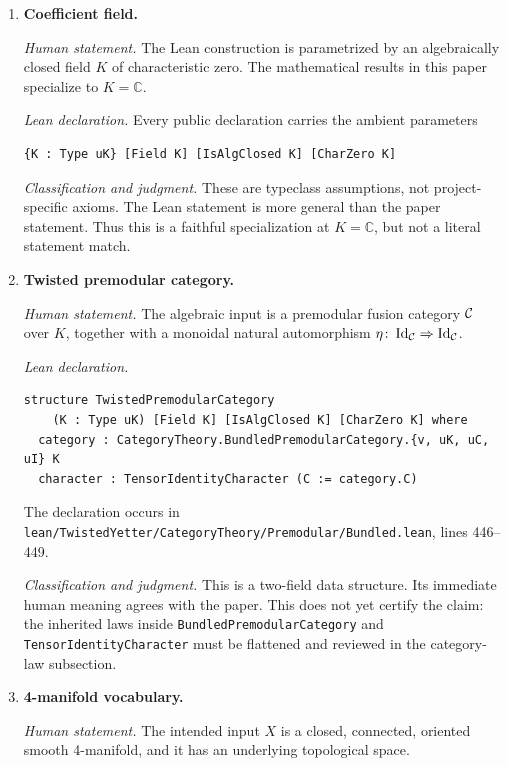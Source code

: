 \begin{enumerate}[label=\textbf{I\arabic*.},leftmargin=*]

\item \textbf{Coefficient field.}

\emph{Human statement.}
The Lean construction is parametrized by an algebraically closed field $K$ of
characteristic zero.  The mathematical results in this paper specialize to
$K=\mathbb C$.

\emph{Lean declaration.}
Every public declaration carries the ambient parameters
\begin{verbatim}
{K : Type uK} [Field K] [IsAlgClosed K] [CharZero K]
\end{verbatim}

\emph{Classification and judgment.}
These are typeclass assumptions, not project-specific axioms.  The Lean
statement is more general than the paper statement.  Thus this is a faithful
specialization at $K=\mathbb C$, but not a literal statement match.

\item \textbf{Twisted premodular category.}

\emph{Human statement.}
The algebraic input is a premodular fusion category $\mathcal{C}$ over $K$, together
with a monoidal natural automorphism
$\eta\colon\operatorname{Id}_{\mathcal{C}}\Rightarrow
\operatorname{Id}_{\mathcal{C}}$.

\emph{Lean declaration.}
\begin{verbatim}
structure TwistedPremodularCategory
    (K : Type uK) [Field K] [IsAlgClosed K] [CharZero K] where
  category : CategoryTheory.BundledPremodularCategory.{v, uK, uC, uI} K
  character : TensorIdentityCharacter (C := category.C)
\end{verbatim}
The declaration occurs in
\nolinkurl{lean/TwistedYetter/CategoryTheory/Premodular/Bundled.lean},
lines 446--449.

\emph{Classification and judgment.}
This is a two-field data structure.  Its immediate human meaning agrees with
the paper.  This does not yet certify the claim: the inherited laws inside
\texttt{BundledPremodularCategory} and \texttt{TensorIdentityCharacter} must be
flattened and reviewed in the category-law subsection.

\item \textbf{4-manifold vocabulary.}

\emph{Human statement.}
The intended input $X$ is a closed, connected, oriented smooth
4-manifold, and it has an underlying topological space.


\end{enumerate}
